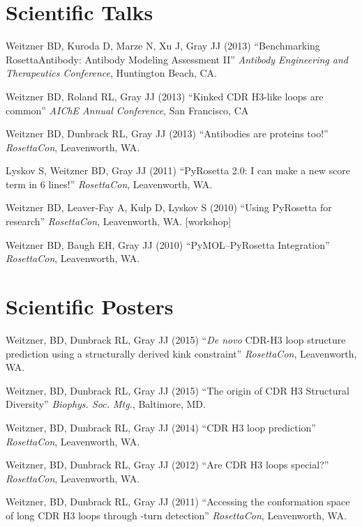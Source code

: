 \documentclass[11pt]{article}
\newcommand{\allcapsspacing}[1]{{\addfontfeature{LetterSpace=7.5}#1}}
\begin{document}
\section*{\allcapsspacing{Scientific Talks}}
\begin{etaremune}
\item Weitzner BD, Kuroda D, Marze N, Xu J, Gray JJ (2013) ``Benchmarking RosettaAntibody: Antibody Modeling Assessment II'' \textit{Antibody Engineering and Therapeutics Conference}, Huntington Beach, CA.
\item Weitzner BD, Roland RL, Gray JJ (2013) ``Kinked CDR H3-like loops are common'' \textit{AIChE Annual Conference}, San Francisco, CA
\item Weitzner BD, Dunbrack RL, Gray JJ (2013) ``Antibodies are proteins too!'' \textit{RosettaCon}, Leavenworth, WA.
\item Lyskov S, Weitzner BD, Gray JJ (2011) ``PyRosetta 2.0: I can make a new score term in 6 lines!'' \textit{RosettaCon}, Leavenworth, WA.
\item Weitzner BD, Leaver-Fay A, Kulp D,  Lyskov S (2010) ``Using PyRosetta for research'' \textit{RosettaCon}, Leavenworth, WA. [workshop]
\item Weitzner BD, Baugh EH, Gray JJ (2010) ``PyMOL--PyRosetta Integration'' \textit{RosettaCon}, Leavenworth, WA.
\end{etaremune}

\section*{\allcapsspacing{Scientific Posters}}
\begin{etaremune}
\item Weitzner, BD, Dunbrack RL, Gray JJ (2015) ``\textit{De novo} CDR-H3 loop structure prediction using a structurally derived kink constraint'' \textit{RosettaCon}, Leavenworth, WA.
\item Weitzner, BD, Dunbrack RL, Gray JJ (2015) ``The origin of CDR H3 Structural Diversity'' \textit{Biophys. Soc. Mtg.}, Baltimore, MD.
\item Weitzner, BD, Dunbrack RL, Gray JJ (2014) ``CDR H3 loop prediction'' \textit{RosettaCon}, Leavenworth, WA.
\item Weitzner, BD, Dunbrack RL, Gray JJ (2012) ``Are CDR H3 loops special?'' \textit{RosettaCon}, Leavenworth, WA.
\item Weitzner, BD, Dunbrack RL, Gray JJ (2011) ``Accessing the conformation space of long CDR H3 loops through \textbeta-turn detection'' \textit{RosettaCon}, Leavenworth, WA.
\end{etaremune}
\end{document}
